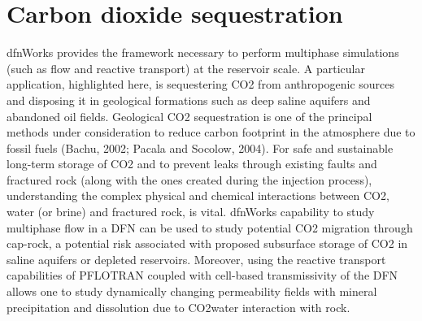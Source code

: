 \documentclass[letterpaper,10pt,english]{sphinxmanual}
\begin{document}
\section{Carbon dioxide sequestration}
\label{\detokenize{applications:carbon-dioxide-sequestration}}
dfnWorks provides the framework necessary to perform multiphase simulations (such as flow and reactive transport) at the reservoir scale. A particular application, highlighted here, is sequestering CO2 from anthropogenic sources and disposing it in geological formations such as deep saline aquifers and abandoned oil fields. Geological CO2 sequestration is one of the principal methods under consideration to reduce carbon footprint in the atmosphere due to fossil fuels (Bachu, 2002; Pacala and Socolow, 2004). For safe and sustainable long-term storage of CO2 and to prevent leaks through existing faults and fractured rock (along with the ones created during the injection process), understanding the complex physical and chemical interactions between CO2, water (or brine) and fractured rock, is vital. dfnWorks capability to study multiphase flow in a DFN can be used to study potential CO2 migration through cap-rock, a potential risk associated with proposed subsurface storage of CO2 in saline aquifers or depleted reservoirs. Moreover, using the reactive transport capabilities of PFLOTRAN coupled with cell-based transmissivity of the DFN allows one to study dynamically changing permeability fields with mineral precipitation and dissolution due to CO2\textendash{}water interaction with rock.
\begin{figure}[htbp]
\centering
\capstart

\noindent{}
\caption{}\label{\detokenize{applications:id1}}\end{figure}
\end{document}

